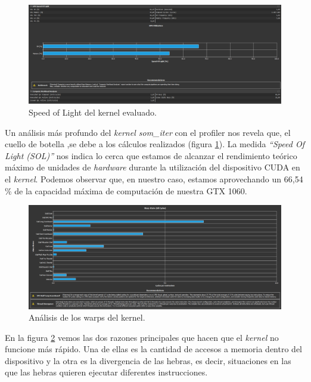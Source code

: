 \begin{figure}[ht]
\centering
\includegraphics[scale=0.3]{imagenes/som_sol.png}
\caption{Speed of Light del kernel evaluado.}
\label{img:sol}
\end{figure}

Un análisis más profundo del \textit{kernel som\_iter} con el profiler nos revela que, el cuello de botella ,se debe a los cálculos realizados (figura \ref{img:sol}). La medida \textit{``Speed Of Light (SOL)''} nos indica lo cerca que estamos de alcanzar el rendimiento teórico máximo de unidades de \textit{hardware} durante la utilización del dispositivo CUDA en el \textit{kernel}. Podemos observar que, en nuestro caso, estamos aprovechando un 66,54 \% de la capacidad máxima de computación de nuestra GTX 1060.\\

\begin{figure}[ht]
\centering
\includegraphics[scale=0.3]{imagenes/som_warp_states.png}
\caption{Análisis de los warps del kernel.}
\label{img:warpssom}
\end{figure}

En la figura \ref{img:warpssom} vemos las dos razones principales que hacen que el \textit{kernel} no funcione más rápido. Una de ellas es la cantidad de accesos a memoria dentro del dispositivo y la otra es la divergencia de las hebras, es decir, situaciones en las que las hebras quieren ejecutar diferentes instrucciones.\\

